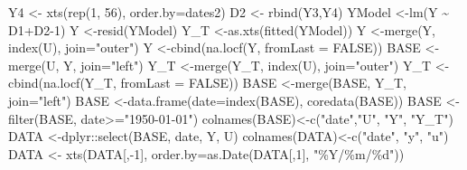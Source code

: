 \documentclass[
]{book}
\newenvironment{Shaded}{\begin{snugshade}}{\end{snugshade}}
\newcommand{\AttributeTok}[1]{\textcolor[rgb]{0.77,0.63,0.00}{#1}}
\newcommand{\ConstantTok}[1]{\textcolor[rgb]{0.00,0.00,0.00}{#1}}
\newcommand{\DecValTok}[1]{\textcolor[rgb]{0.00,0.00,0.81}{#1}}
\newcommand{\FunctionTok}[1]{\textcolor[rgb]{0.00,0.00,0.00}{#1}}
\newcommand{\NormalTok}[1]{#1}
\newcommand{\OtherTok}[1]{\textcolor[rgb]{0.56,0.35,0.01}{#1}}
\newcommand{\SpecialCharTok}[1]{\textcolor[rgb]{0.00,0.00,0.00}{#1}}
\newcommand{\StringTok}[1]{\textcolor[rgb]{0.31,0.60,0.02}{#1}}
\begin{document}
\begin{Shaded}
\begin{Highlighting}[]
\NormalTok{Y4         }\OtherTok{\textless{}{-}} \FunctionTok{xts}\NormalTok{(}\FunctionTok{rep}\NormalTok{(}\DecValTok{1}\NormalTok{,  }\DecValTok{56}\NormalTok{), }\AttributeTok{order.by=}\NormalTok{dates2)}
\NormalTok{D2         }\OtherTok{\textless{}{-}} \FunctionTok{rbind}\NormalTok{(Y3,Y4)}
\NormalTok{YModel     }\OtherTok{\textless{}{-}}\FunctionTok{lm}\NormalTok{(Y }\SpecialCharTok{\textasciitilde{}}\NormalTok{ D1}\SpecialCharTok{+}\NormalTok{D2}\DecValTok{{-}1}\NormalTok{)}
\NormalTok{Y          }\OtherTok{\textless{}{-}}\FunctionTok{resid}\NormalTok{(YModel)}
\NormalTok{Y\_T        }\OtherTok{\textless{}{-}}\FunctionTok{as.xts}\NormalTok{(}\FunctionTok{fitted}\NormalTok{(YModel))}
\NormalTok{Y          }\OtherTok{\textless{}{-}}\FunctionTok{merge}\NormalTok{(Y, }\FunctionTok{index}\NormalTok{(U), }\AttributeTok{join=}\StringTok{"outer"}\NormalTok{)}
\NormalTok{Y          }\OtherTok{\textless{}{-}}\FunctionTok{cbind}\NormalTok{(}\FunctionTok{na.locf}\NormalTok{(Y, }\AttributeTok{fromLast =} \ConstantTok{FALSE}\NormalTok{))}
\NormalTok{BASE       }\OtherTok{\textless{}{-}}\FunctionTok{merge}\NormalTok{(U, Y, }\AttributeTok{join=}\StringTok{"left"}\NormalTok{)}
\NormalTok{Y\_T        }\OtherTok{\textless{}{-}}\FunctionTok{merge}\NormalTok{(Y\_T, }\FunctionTok{index}\NormalTok{(U), }\AttributeTok{join=}\StringTok{"outer"}\NormalTok{)}
\NormalTok{Y\_T        }\OtherTok{\textless{}{-}}\FunctionTok{cbind}\NormalTok{(}\FunctionTok{na.locf}\NormalTok{(Y\_T, }\AttributeTok{fromLast =} \ConstantTok{FALSE}\NormalTok{))}
\NormalTok{BASE       }\OtherTok{\textless{}{-}}\FunctionTok{merge}\NormalTok{(BASE, Y\_T, }\AttributeTok{join=}\StringTok{"left"}\NormalTok{)}
\NormalTok{BASE       }\OtherTok{\textless{}{-}}\FunctionTok{data.frame}\NormalTok{(}\AttributeTok{date=}\FunctionTok{index}\NormalTok{(BASE), }\FunctionTok{coredata}\NormalTok{(BASE))}
\NormalTok{BASE       }\OtherTok{\textless{}{-}}\FunctionTok{filter}\NormalTok{(BASE, date}\SpecialCharTok{\textgreater{}=}\StringTok{"1950{-}01{-}01"}\NormalTok{)}
\FunctionTok{colnames}\NormalTok{(BASE)}\OtherTok{\textless{}{-}}\FunctionTok{c}\NormalTok{(}\StringTok{"date"}\NormalTok{,}\StringTok{"U"}\NormalTok{, }\StringTok{"Y"}\NormalTok{, }\StringTok{"Y\_T"}\NormalTok{)}
\NormalTok{DATA    }\OtherTok{\textless{}{-}}\NormalTok{dplyr}\SpecialCharTok{::}\FunctionTok{select}\NormalTok{(BASE, date, Y, U)}
\FunctionTok{colnames}\NormalTok{(DATA)}\OtherTok{\textless{}{-}}\FunctionTok{c}\NormalTok{(}\StringTok{"date"}\NormalTok{, }\StringTok{"y"}\NormalTok{, }\StringTok{"u"}\NormalTok{)}
\NormalTok{DATA    }\OtherTok{\textless{}{-}} \FunctionTok{xts}\NormalTok{(DATA[,}\SpecialCharTok{{-}}\DecValTok{1}\NormalTok{], }\AttributeTok{order.by=}\FunctionTok{as.Date}\NormalTok{(DATA[,}\DecValTok{1}\NormalTok{], }\StringTok{"\%Y/\%m/\%d"}\NormalTok{))}

\end{Highlighting}
\end{Shaded}
\end{document}
